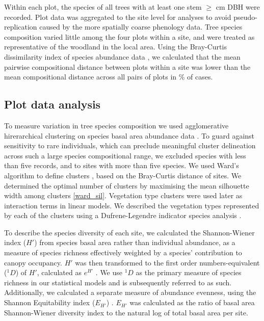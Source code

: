 \documentclass[11pt,a4paper]{article}
\begin{document}
Within each plot, the species of all trees with at least one stem $\geq$\stemSize{} cm DBH were recorded. Plot data was aggregated to the site level for analyses to avoid pseudo-replication caused by the more spatially coarse phenology data. Tree species composition varied little among the four plots within a site, and were treated as representative of the woodland in the local area. Using the Bray-Curtis dissimilarity index of species abundance data \citep{}, we calculated that the mean pairwise compositional distance between plots within a site was lower than the mean compositional distance across all pairs of plots in \plotDistPer{}\% of cases.

\subsection{Plot data analysis} 

To measure variation in tree species composition we used agglomerative hirerarchical clustering on species basal area abundance data \citep{Kreft2010, Fayolle2014}. To guard against sensitivity to rare individuals, which can preclude meaningful cluster delineation across such a large species compositional range, we excluded species with less than five records, and to sites with more than five species. We used Ward's algorithm to define clusters \citep{Murtagh2014}, based on the Bray-Curtis distance of sites. We determined the optimal number of clusters by maximising the mean silhouette width among clusters \citep{Rousseeuw1987} \autoref{ward_sil}. Vegetation type clusters were used later as interaction terms in linear models. We described the vegetation types represented by each of the clusters using a Dufrene-Legendre indicator species analysis \citep{Dufrene1997}.

To describe the species diversity of each site, we calculated the Shannon-Wiener index ($H'$) from species basal area rather than individual abundance, as a measure of species richness effectively weighted by a species' contribution to canopy occupancy. $H'$ was then transformed to the first order numbers-equivalent ($^1\!D$) of $H'$, calculated as $e^{H'}$ \citep{Jost2007}. We use $^1\!D$ as the primary measure of species richness in our statistical models and is subsequently referred to as such. Additionally, we calculated a separate measure of abundance evenness, using the Shannon Equitability index ($E_{H'}$) \citep{Smith1996}. $E_{H'}$ was calculated as the ratio of basal area Shannon-Wiener diversity index to the natural log of total basal area per site.
\end{document}
